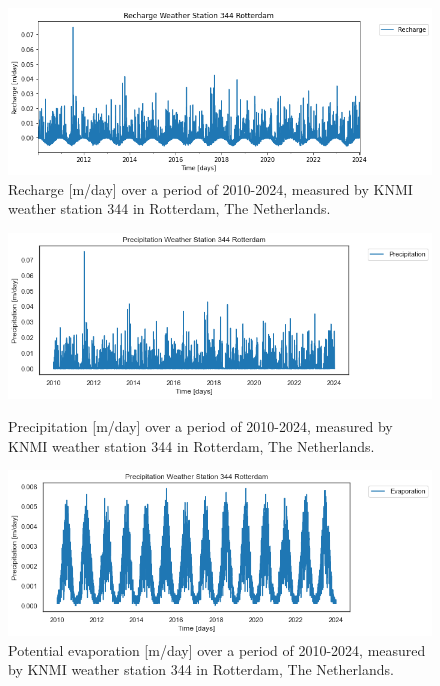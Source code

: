 \begin{figure}[htbp]
    \centering
    \includegraphics[width=0.75\linewidth]{frontmatter/Heijplaat-fig/Recharge.png}
    \caption{Recharge [m/day] over a period of 2010-2024, measured by KNMI weather station 344 in Rotterdam, The Netherlands.}
    \label{R}
\end{figure} 
\vspace{0.5cm}
\begin{figure}[h]
    \centering
    \begin{minipage}{0.45\textwidth}
        \centering
        \includegraphics[width=\linewidth]{frontmatter/Heijplaat-fig/P.png}
        \caption{Precipitation [m/day] over a period of 2010-2024, measured by KNMI weather station 344 in Rotterdam, The Netherlands.}
        \label{P}
    \end{minipage}\hfill
    \begin{minipage}{0.45\textwidth}
        \centering
        \includegraphics[width=\linewidth]{frontmatter/Heijplaat-fig/ET.png}
        \caption{Potential evaporation [m/day] over a period of 2010-2024, measured by KNMI weather station 344 in Rotterdam, The Netherlands.}
        \label{ET}
    \end{minipage}
\end{figure}


